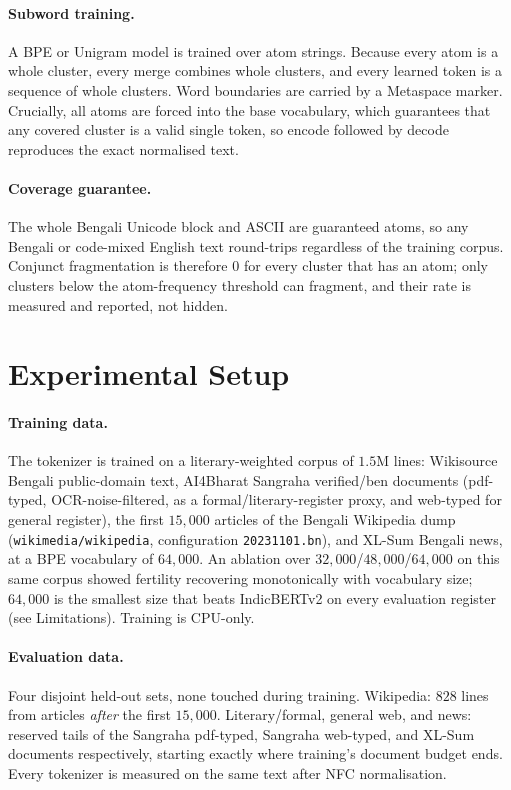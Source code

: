 \documentclass[11pt]{article}
\begin{document}
\paragraph{Subword training.} A BPE or Unigram model is trained over atom
strings. Because every atom is a whole cluster, every merge combines whole
clusters, and every learned token is a sequence of whole clusters. Word
boundaries are carried by a Metaspace marker. Crucially, all atoms are forced
into the base vocabulary, which guarantees that any covered cluster is a valid
single token, so encode followed by decode reproduces the exact normalised text.

\paragraph{Coverage guarantee.} The whole Bengali Unicode block and ASCII are
guaranteed atoms, so any Bengali or code-mixed English text round-trips
regardless of the training corpus. Conjunct fragmentation is therefore $0$ for
every cluster that has an atom; only clusters below the atom-frequency threshold
can fragment, and their rate is measured and reported, not hidden.

\section{Experimental Setup}
\paragraph{Training data.} The tokenizer is trained on a literary-weighted
corpus of $1.5$M lines: Wikisource Bengali public-domain text, AI4Bharat
Sangraha verified/ben documents (pdf-typed, OCR-noise-filtered, as a
formal/literary-register proxy, and web-typed for general register), the first
$15{,}000$ articles of the Bengali Wikipedia dump (\texttt{wikimedia/wikipedia},
configuration \texttt{20231101.bn}), and XL-Sum Bengali news, at a BPE
vocabulary of $64{,}000$. An ablation over $32{,}000$/$48{,}000$/$64{,}000$ on
this same corpus showed fertility recovering monotonically with vocabulary
size; $64{,}000$ is the smallest size that beats IndicBERTv2 on every
evaluation register (see Limitations). Training is CPU-only.

\paragraph{Evaluation data.} Four disjoint held-out sets, none touched during
training. Wikipedia: $828$ lines from articles \emph{after} the first
$15{,}000$. Literary/formal, general web, and news: reserved tails of the
Sangraha pdf-typed, Sangraha web-typed, and XL-Sum documents respectively,
starting exactly where training's document budget ends. Every tokenizer is
measured on the same text after NFC normalisation.
\end{document}
